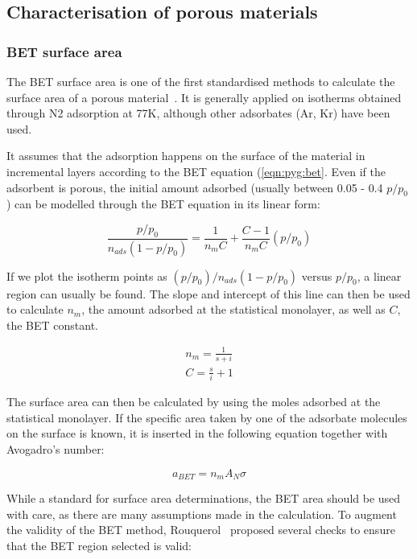 \subsection{Characterisation of porous materials}

\subsubsection{BET surface area}

The BET surface area is one of the first standardised methods to calculate the
surface area of a porous material~\cite{brunauerAdsorptionGasesMultimolecular1938}. 
It is generally applied on isotherms obtained
through N2 adsorption at 77K, although other adsorbates (Ar, Kr) have been used.

It assumes that the adsorption happens on the surface of the material in
incremental layers according to the BET equation (\ref{eqn:pyg:bet}. 
Even if the adsorbent is porous, the initial amount adsorbed 
(usually between 0.05 - 0.4 \(p/p_0\)) can be
modelled through the BET equation in its linear form:

\begin{equation}
    \frac{p/p_0}{n_{ads} (1-p/p_0)} = \frac{1}{n_{m} C} + \frac{C - 1}{n_{m} C}(p/p_0)
\end{equation}

If we plot the isotherm points as
\({(p/p_0)}/{n_{ads}(1-p/p_0)}\) versus \(p/p_0\), a linear region
can usually be found. The slope and intercept of this line
can then be used to calculate \(n_{m}\), the amount adsorbed at the
statistical monolayer, as well as \(C\), the BET constant.

\begin{gather}
    n_{m} = \frac{1}{s+i} \\
    C = \frac{s}{i} + 1
\end{gather}

The surface area can then be calculated by using the moles
adsorbed at the statistical monolayer. If the specific area taken
by one of the adsorbate molecules on the surface is known, it is
inserted in the following equation together with Avogadro's number:

\begin{equation}
    a_{BET} = n_m A_N \sigma
\end{equation}


While a standard for surface area determinations, the BET area
should be used with care, as there are many assumptions made in
the calculation. To augment the validity of the BET
method, Rouquerol~\cite{rouquerolAdsorptionPowdersPorous2013} proposed
several checks to ensure that the BET region selected is valid:


